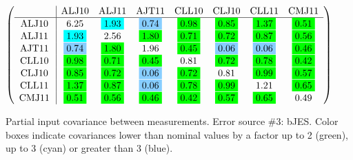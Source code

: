\begin{table}[H]
\scriptsize
\begin{center}
\renewcommand{\arraystretch}{1.1}
\begin{math}\left(\begin{array}{c|ccccccc}
 & \mathrm{ALJ10} & 
\mathrm{ALJ11} & 
\mathrm{AJT11} & 
\mathrm{CLL10} & 
\mathrm{CLJ10} & 
\mathrm{CLL11} & 
\mathrm{CMJ11} \\
\hline
\mathrm{ALJ10} \hspace*{2pt} &       6.25 &  \colorbox{Cyan1}{$      1.93$} &  \colorbox{SkyBlue1}{$      0.74$} &  \colorbox{Green1}{$      0.98$} &  \colorbox{Green1}{$      0.85$} &  \colorbox{Green1}{$      1.37$} &  \colorbox{Green1}{$      0.51$} \\
\mathrm{ALJ11} \hspace*{2pt} &  \colorbox{Cyan1}{$      1.93$} &       2.56 &  \colorbox{Green1}{$      1.80$} &  \colorbox{Green1}{$      0.71$} &  \colorbox{Green1}{$      0.72$} &  \colorbox{Green1}{$      0.87$} &  \colorbox{Green1}{$      0.56$} \\
\mathrm{AJT11} \hspace*{2pt} &  \colorbox{SkyBlue1}{$      0.74$} &  \colorbox{Green1}{$      1.80$} &       1.96 &  \colorbox{Green1}{$      0.45$} &  \colorbox{SkyBlue1}{$      0.06$} &  \colorbox{SkyBlue1}{$      0.06$} &  \colorbox{Green1}{$      0.46$} \\
\mathrm{CLL10} \hspace*{2pt} &  \colorbox{Green1}{$      0.98$} &  \colorbox{Green1}{$      0.71$} &  \colorbox{Green1}{$      0.45$} &       0.81 &  \colorbox{Green1}{$      0.72$} &  \colorbox{Green1}{$      0.78$} &  \colorbox{Green1}{$      0.42$} \\
\mathrm{CLJ10} \hspace*{2pt} &  \colorbox{Green1}{$      0.85$} &  \colorbox{Green1}{$      0.72$} &  \colorbox{SkyBlue1}{$      0.06$} &  \colorbox{Green1}{$      0.72$} &       0.81 &  \colorbox{Green1}{$      0.99$} &  \colorbox{Green1}{$      0.57$} \\
\mathrm{CLL11} \hspace*{2pt} &  \colorbox{Green1}{$      1.37$} &  \colorbox{Green1}{$      0.87$} &  \colorbox{SkyBlue1}{$      0.06$} &  \colorbox{Green1}{$      0.78$} &  \colorbox{Green1}{$      0.99$} &       1.21 &  \colorbox{Green1}{$      0.65$} \\
\mathrm{CMJ11} \hspace*{2pt} &  \colorbox{Green1}{$      0.51$} &  \colorbox{Green1}{$      0.56$} &  \colorbox{Green1}{$      0.46$} &  \colorbox{Green1}{$      0.42$} &  \colorbox{Green1}{$      0.57$} &  \colorbox{Green1}{$      0.65$} &       0.49 \\
\end{array}\right)\end{math}
\caption{Partial input covariance between measurements. Error source \#3: bJES. Color boxes indicate covariances lower than nominal values by a factor up to 2 (green), up to 3 (cyan) or greater than 3 (blue).}
\renewcommand{\arraystretch}{1}
\end{center}
\end{table}
